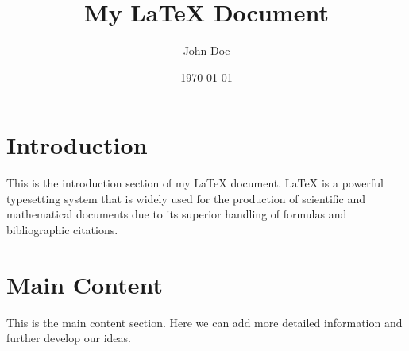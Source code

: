 \documentclass{article}
\title{My LaTeX Document}
\author{John Doe}
\date{\today}
\begin{document}
\maketitle

\section{Introduction}
This is the introduction section of my LaTeX document. LaTeX is a powerful typesetting system that is widely used for the production of scientific and mathematical documents due to its superior handling of formulas and bibliographic citations.

\section{Main Content}
This is the main content section. Here we can add more detailed information and further develop our ideas.
\end{document}
